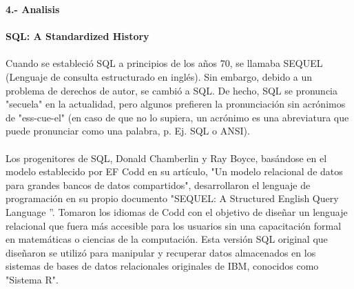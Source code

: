 \documentclass[preprint,12pt]{article}
\begin{document}
\begin{justify}
\textbf{4.- Analisis} \\\\

\textbf {SQL: A Standardized History}\\\\

Cuando se estableció SQL a principios de los años 70, se llamaba SEQUEL (Lenguaje de consulta estructurado en inglés). Sin embargo, debido a un problema de derechos de autor, se cambió a SQL. De hecho, SQL se pronuncia "secuela" en la actualidad, pero algunos prefieren la pronunciación sin acrónimos de "ess-cue-el" (en caso de que no lo supiera, un acrónimo es una abreviatura que puede pronunciar como una palabra, p. Ej. SQL o ANSI).\\\\Los progenitores de SQL, Donald Chamberlin y Ray Boyce, basándose en el modelo establecido por EF Codd en su artículo, "Un modelo relacional de datos para grandes bancos de datos compartidos", desarrollaron el lenguaje de programación en su propio documento "SEQUEL: A Structured English Query Language ”. Tomaron los idiomas de Codd con el objetivo de diseñar un lenguaje relacional que fuera más accesible para los usuarios sin una capacitación formal en matemáticas o ciencias de la computación. Esta versión SQL original que diseñaron se utilizó para manipular y recuperar datos almacenados en los sistemas de bases de datos relacionales originales de IBM, conocidos como "Sistema R".

\end{justify}
\end{document}
